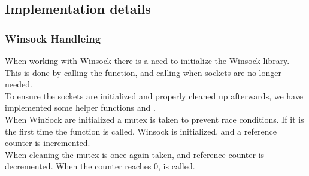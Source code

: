 \documentclass[Main]{subfiles}
\begin{document}
\subsection{Implementation details}
\subsubsection{Winsock Handleing}
When working with Winsock there is a need to initialize the Winsock library.
This is done by calling the  function, and calling  when sockets are no longer needed.\\
To ensure the sockets are initialized and properly cleaned up afterwards, 
we have implemented some helper functions  and .\\
When WinSock are initialized a mutex is taken to prevent race conditions.
If it is the first time the function is called, Winsock is initialized, and a reference counter is incremented.\\
When cleaning the mutex is once again taken, and reference counter is decremented. When the counter reaches 0,  is called.
\end{document}
